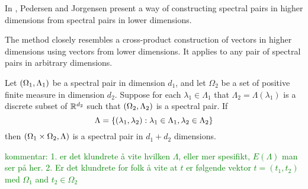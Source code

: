 \documentclass[../thesis.tex]{subfiles}
\begin{document}
In \cite{jorgensenSpectralPairsCartesian2001}, Pedersen and Jorgensen present a way of constructing spectral pairs in higher dimensions from spectral pairs in lower dimensions. 

The method closely resembles a cross-product construction of vectors in higher dimensions using vectors from lower dimensions. It applies to any pair of spectral pairs in arbitrary dimensions.  %
\begin{theorem}\label{thrm:construction_spectra}
    Let $(\Omega_1,\Lambda_1)$ be a spectral pair in dimension $d_1$, and let $\Omega_2$ be a set of positive finite measure in dimension $d_2$. Suppose for each $\lambda_1 \in \Lambda_1$ that $\Lambda_2=\Lambda(\lambda_1)$ is a discrete subset of $\mathbb{R}^{d_2}$ such that $(\Omega_2,\Lambda_2)$ is a spectral pair. If 
    \begin{equation}
        \Lambda = \{(\lambda_1, \lambda_2): \lambda_1\in \Lambda_1, \lambda_2 \in \Lambda_2\} 
    \end{equation}
    then $(\Omega_1\times\Omega_2, \Lambda)$ is a spectral pair in $d_1+d_2$ dimensions. 
\end{theorem}
\textcolor{green}{kommentar: 1. er det klundrete å vite hvilken $\Lambda$, eller mer spesifikt, $E(\Lambda)$ man ser på her. 2. Er det klundrete for folk å vite at $t$ er følgende vektor $t = (t_1,t_2)$ med $\Omega_1$ and $t_2 \in \Omega_2$}
\end{document}
